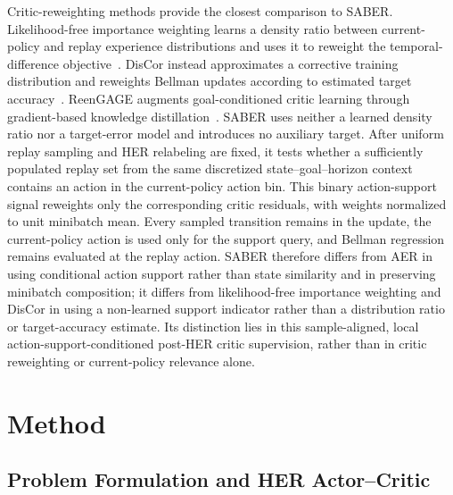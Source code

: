 \documentclass[letterpaper]{article}
\begin{document}
Critic-reweighting methods provide the closest comparison to SABER. Likelihood-free importance weighting learns a density ratio between current-policy and replay experience distributions and uses it to reweight the temporal-difference objective~\citep{sinha2022lfiw}. DisCor instead approximates a corrective training distribution and reweights Bellman updates according to estimated target accuracy~\citep{kumar2020discor}. ReenGAGE augments goal-conditioned critic learning through gradient-based knowledge distillation~\citep{levine2023reengage}. SABER uses neither a learned density ratio nor a target-error model and introduces no auxiliary target. After uniform replay sampling and HER relabeling are fixed, it tests whether a sufficiently populated replay set from the same discretized state--goal--horizon context contains an action in the current-policy action bin. This binary action-support signal reweights only the corresponding critic residuals, with weights normalized to unit minibatch mean. Every sampled transition remains in the update, the current-policy action is used only for the support query, and Bellman regression remains evaluated at the replay action. SABER therefore differs from AER in using conditional action support rather than state similarity and in preserving minibatch composition; it differs from likelihood-free importance weighting and DisCor in using a non-learned support indicator rather than a distribution ratio or target-accuracy estimate. Its distinction lies in this sample-aligned, local action-support-conditioned post-HER critic supervision, rather than in critic reweighting or current-policy relevance alone.

\section{Method}

\subsection{Problem Formulation and HER Actor--Critic}
\end{document}
